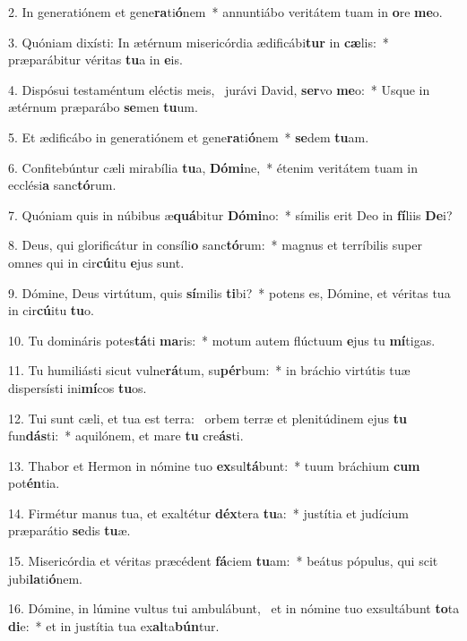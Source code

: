 2. In generatiónem et gene\textbf{ra}ti\textbf{ó}nem~*  annuntiábo veritátem tuam in \textbf{o}re \textbf{me}o.\

3. Quóniam dixísti: In ætérnum misericórdia ædificábi\textbf{tur} in \textbf{cæ}lis:~*  præparábitur véritas \textbf{tu}a in \textbf{e}is.\

4. Dispósui testaméntum eléctis meis, \dag\  jurávi David, \textbf{ser}vo \textbf{me}o:~*  Usque in ætérnum præparábo \textbf{se}men \textbf{tu}um.\

5. Et ædificábo in generatiónem et gene\textbf{ra}ti\textbf{ó}nem~*  \textbf{se}dem \textbf{tu}am.\

6. Confitebúntur cæli mirabília \textbf{tu}a, \textbf{Dó}\textbf{mi}ne,~*  étenim veritátem tuam in ecclési\textbf{a} sanc\textbf{tó}rum.\

7. Quóniam quis in núbibus æ\textbf{quá}bitur \textbf{Dó}\textbf{mi}no:~*  símilis erit Deo in \textbf{fí}liis \textbf{De}i?\

8. Deus, qui glorificátur in consíli\textbf{o} sanc\textbf{tó}rum:~*  magnus et terríbilis super omnes qui in cir\textbf{cú}itu \textbf{e}jus sunt.\

9. Dómine, Deus virtútum, quis \textbf{sí}milis \textbf{ti}bi?~*  potens es, Dómine, et véritas tua in cir\textbf{cú}itu \textbf{tu}o.\

10. Tu domináris potes\textbf{tá}ti \textbf{ma}ris:~*  motum autem flúctuum \textbf{e}jus tu \textbf{mí}tigas.\

11. Tu humiliásti sicut vulne\textbf{rá}tum, su\textbf{pér}bum:~*  in bráchio virtútis tuæ dispersísti ini\textbf{mí}cos \textbf{tu}os.\

12. Tui sunt cæli, et tua est terra: \dag\  orbem terræ et plenitúdinem ejus \textbf{tu} fun\textbf{dás}ti:~*  aquilónem, et mare \textbf{tu} cre\textbf{ás}ti.\

13. Thabor et Hermon in nómine tuo \textbf{ex}sul\textbf{tá}bunt:~*  tuum bráchium \textbf{cum} pot\textbf{én}tia.\

14. Firmétur manus tua, et exaltétur \textbf{déx}tera \textbf{tu}a:~*  justítia et judícium præparátio \textbf{se}dis \textbf{tu}æ.\

15. Misericórdia et véritas præcédent \textbf{fá}ciem \textbf{tu}am:~*  beátus pópulus, qui scit jubi\textbf{la}ti\textbf{ó}nem.\

16. Dómine, in lúmine vultus tui ambulábunt, \dag\  et in nómine tuo exsultábunt \textbf{to}ta \textbf{di}e:~*  et in justítia tua ex\textbf{al}ta\textbf{bún}tur.\

